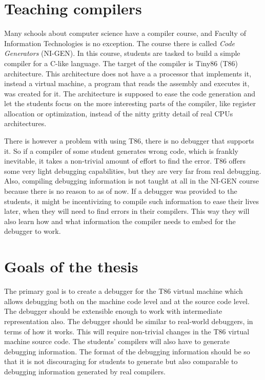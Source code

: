 \section{Teaching compilers}
Many schools about computer science have a compiler course, and Faculty of
Information Technologies is no exception. The course there is called
\textit{Code Generators} (NI-GEN). In this course, students are tasked to build
a simple compiler for a C-like language. The target of the compiler is Tiny86
(T86) architecture. This architecture  does not have a a processor that implements it, instead a virtual
machine, a program that reads the assembly and executes it, was created for it.
The architecture is supposed to ease the code generation and let the students
focus on the more interesting parts of the compiler, like register allocation
or optimization, instead of the nitty gritty detail of real CPUs architectures.

There is however a problem with using T86, there is no debugger that supports
it. So if a compiler of some student generates wrong code, which is frankly
inevitable, it takes a non-trivial amount of effort to find the error. T86
offers some very light debugging capabilities, but they are very far from real
debugging. Also, compiling debugging information is not taught at all in the
NI-GEN course because there is no reason to as of now. If a debugger was
provided to the students, it might be incentivizing to compile such information
to ease their lives later, when they will need to find errors in their
compilers. This way they will also learn how and what information the compiler
needs to embed for the debugger to work.

\section{Goals of the thesis}
The primary goal is to create a debugger for the T86 virtual machine which
allows debugging both on the machine code level and at the source code level.
The debugger should be extensible enough to work with intermediate
representation also. The debugger should be similar to real-world debuggers, in
terms of how it works. This will require non-trivial changes in the T86 virtual
machine source code. The students' compilers will also have to generate
debugging information. The format of the debugging information should be so
that it is not discouraging for students to generate but also comparable
to debugging information generated by real compilers.

